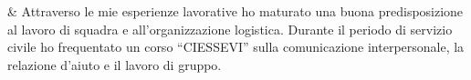 & Attraverso le mie esperienze lavorative ho maturato una buona predisposizione al lavoro di squadra e all'organizzazione logistica. Durante il periodo di servizio civile ho frequentato un corso ``CIESSEVI'' sulla comunicazione interpersonale, la relazione d'aiuto e il lavoro di gruppo.\\